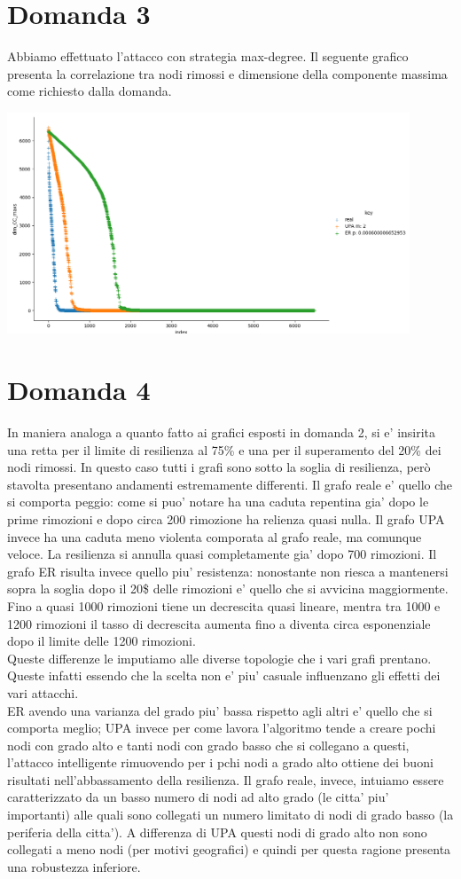 \documentclass{article}
\begin{document}
\section*{Domanda 3}
Abbiamo effettuato l'attacco con strategia max-degree. Il seguente grafico presenta la correlazione tra nodi rimossi e dimensione della componente massima come richiesto dalla domanda.

\includegraphics[width=0.9\textwidth]{Figure_3}

\section*{Domanda 4}
In maniera analoga a quanto fatto ai grafici esposti in domanda 2, si e' insirita una retta per il limite di resilienza al 75\% e una per il superamento del 20\% dei nodi rimossi.
In questo caso tutti i grafi sono sotto la soglia di resilienza, però stavolta presentano andamenti estremamente differenti.
Il grafo reale e' quello che si comporta peggio: come si puo' notare ha una caduta repentina gia' dopo le prime rimozioni e dopo circa 200 rimozione ha relienza quasi nulla.
Il grafo UPA invece ha una caduta meno violenta comporata al grafo reale, ma comunque veloce. La resilienza si annulla quasi completamente gia' dopo 700 rimozioni.
Il grafo ER risulta invece quello piu' resistenza: nonostante non riesca a mantenersi sopra la soglia dopo il 20\$ delle rimozioni e' quello che si avvicina maggiormente. Fino a quasi 1000 rimozioni tiene un decrescita quasi lineare, mentra tra 1000 e 1200 rimozioni il tasso di decrescita aumenta fino a diventa circa esponenziale dopo il limite delle 1200 rimozioni.\\
Queste differenze le imputiamo alle diverse topologie che i vari grafi prentano. Queste infatti essendo che la scelta non e' piu' casuale influenzano gli effetti dei vari attacchi.\\
ER avendo una varianza del grado piu' bassa rispetto agli altri e' quello che si comporta meglio; UPA invece per come lavora l'algoritmo tende a creare pochi nodi con grado alto e tanti nodi con grado basso che si collegano a questi, l'attacco intelligente rimuovendo per i pchi nodi a grado alto ottiene dei buoni risultati nell'abbassamento della resilienza.
Il grafo reale, invece, intuiamo essere caratterizzato da un basso numero di nodi ad alto grado (le citta' piu' importanti) alle quali sono collegati un numero limitato di nodi di grado basso (la periferia della citta'). A differenza di UPA questi nodi di grado alto non sono collegati a meno nodi (per motivi geografici) e quindi per questa ragione presenta una robustezza inferiore.
\end{document}
